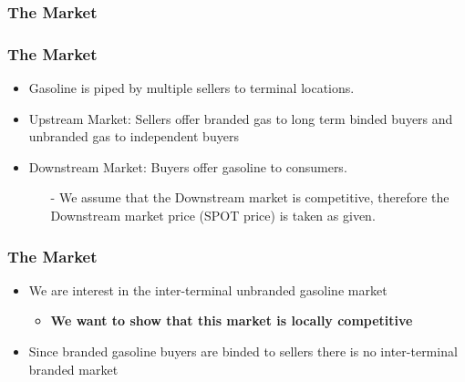 \documentclass{beamer}
\begin{document}
\begin{frame}
  \frametitle{The Market}
    
  \center{}
\end{frame}

\begin{frame}
  \frametitle{The Market}
  \begin{itemize}
    \item Gasoline is piped by multiple sellers to terminal locations.
    \item Upstream Market: Sellers offer branded gas to long term binded buyers and unbranded gas to independent buyers
    \item Downstream Market: Buyers offer gasoline to consumers.
      \begin{itemize}
        \item[-] \small{We assume that the Downstream market is competitive, therefore the Downstream market price (SPOT price) is taken as given.}
      \end{itemize}
  \end{itemize}
\end{frame}

\begin{frame}
  \frametitle{The Market}
  \begin{itemize}
    \item We are interest in the inter-terminal unbranded gasoline market
      \begin{itemize}
        \item \textbf{We want to show that this market is locally competitive}
      \end{itemize}
    \item Since branded gasoline buyers are binded to sellers there is no inter-terminal branded market
  \end{itemize}
\end{frame}
\end{document}

